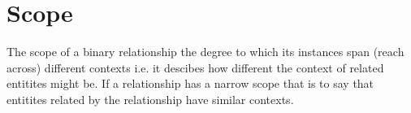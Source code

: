 

\section{Scope}
The scope of a binary relationship the degree to which its instances span (reach across) different contexts i.e. it descibes how different the context of related entitites might be. If a relationship has a narrow scope that is to say that entitites related by the relationship have similar contexts. 

